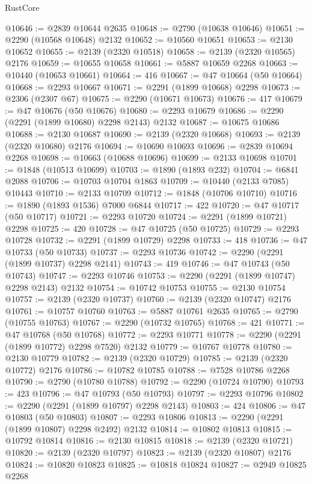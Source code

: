 \begin{lexlean}{RustCore}
\begin{coremodule}
@10646 := @2839 @10644 @2635
@10648 := @2790 (@10638 @10646)
@10651 := @2290 (@10568 @10648) @2132
@10652 := @10560 @10651
@10653 := @2130 @10652
@10655 := @2139 (@2320 @10518)
@10658 := @2139 (@2320 @10565) @2176
@10659 := @10655 @10658
@10661 := @5887 @10659 @2268
@10663 := @10440 (@10653 @10661)
@10664 := 416
@10667 := @47 @10664 (@50 @10664)
@10668 := @2293 @10667
@10671 := @2291 (@1899 @10668) @2298
@10673 := @2306 (@2307 @67)
@10675 := @2290 (@10671 @10673)
@10676 := 417
@10679 := @47 @10676 (@50 @10676)
@10680 := @2293 @10679
@10686 := @2290 (@2291 (@1899 @10680) @2298 @2143) @2132
@10687 := @10675 @10686
@10688 := @2130 @10687
@10690 := @2139 (@2320 @10668)
@10693 := @2139 (@2320 @10680) @2176
@10694 := @10690 @10693
@10696 := @2839 @10694 @2268
@10698 := @10663 (@10688 @10696)
@10699 := @2133 @10698
@10701 := @1848 (@10513 @10699)
@10703 := @1890 (@1893 @232)
@10704 := @6841 @2088
@10706 := @10703 @10704 @1863
@10709 := @10440 (@2133 @7085) @10443
@10710 := @2133 @10709
@10712 := @1848 (@10706 @10710)
@10716 := @1890 (@1893 @1536) @7000 @6844
@10717 := 422
@10720 := @47 @10717 (@50 @10717)
@10721 := @2293 @10720
@10724 := @2291 (@1899 @10721) @2298
@10725 := 420
@10728 := @47 @10725 (@50 @10725)
@10729 := @2293 @10728
@10732 := @2291 (@1899 @10729) @2298
@10733 := 418
@10736 := @47 @10733 (@50 @10733)
@10737 := @2293 @10736
@10742 := @2290 (@2291 (@1899 @10737) @2298 @2141)
@10743 := 419
@10746 := @47 @10743 (@50 @10743)
@10747 := @2293 @10746
@10753 := @2290 (@2291 (@1899 @10747) @2298 @2143) @2132
@10754 := @10742 @10753
@10755 := @2130 @10754
@10757 := @2139 (@2320 @10737)
@10760 := @2139 (@2320 @10747) @2176
@10761 := @10757 @10760
@10763 := @5887 @10761 @2635
@10765 := @2790 (@10755 @10763)
@10767 := @2290 (@10732 @10765)
@10768 := 421
@10771 := @47 @10768 (@50 @10768)
@10772 := @2293 @10771
@10778 := @2290 (@2291 (@1899 @10772) @2298 @7520) @2132
@10779 := @10767 @10778
@10780 := @2130 @10779
@10782 := @2139 (@2320 @10729)
@10785 := @2139 (@2320 @10772) @2176
@10786 := @10782 @10785
@10788 := @7528 @10786 @2268
@10790 := @2790 (@10780 @10788)
@10792 := @2290 (@10724 @10790)
@10793 := 423
@10796 := @47 @10793 (@50 @10793)
@10797 := @2293 @10796
@10802 := @2290 (@2291 (@1899 @10797) @2298 @2143)
@10803 := 424
@10806 := @47 @10803 (@50 @10803)
@10807 := @2293 @10806
@10813 := @2290 (@2291 (@1899 @10807) @2298 @2492) @2132
@10814 := @10802 @10813
@10815 := @10792 @10814
@10816 := @2130 @10815
@10818 := @2139 (@2320 @10721)
@10820 := @2139 (@2320 @10797)
@10823 := @2139 (@2320 @10807) @2176
@10824 := @10820 @10823
@10825 := @10818 @10824
@10827 := @2949 @10825 @2268

\end{coremodule}
\end{lexlean}
